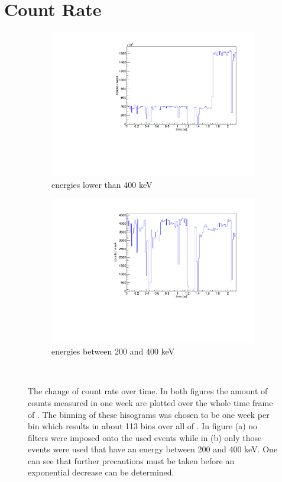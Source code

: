 \documentclass[encoding=utf8,british]{tumphthesis}
\begin{document}
\section{Count Rate}
\label{sec:EventAct}

\begin{figure}[t!]
	\centering
	\begin{subfigure}{.475\textwidth}
		\centering
		\includegraphics[width=\textwidth]{./Bilder/ZeitverlaufALLE.pdf}
		\caption{energies lower than 400 keV}
		\label{fig:ZeitAll}
	\end{subfigure}\hfill%
	\begin{subfigure}{.475\textwidth}
		\centering
		\includegraphics[width=\textwidth]{./Bilder/ZeitverlaufLimits.pdf}
		\caption{energies between 200 and 400 keV}
		\label{fig:ZeitLimits}
	\end{subfigure}
    \\
    \caption{
    	The change of count rate over time.
    	In both figures the amount of counts measured in one week are plotted over the whole time frame of \PII. 
        The binning of these hisograms was chosen to be one week per bin which results in about 113 bins over all of  \PII.
    	In figure (a) no filters were imposed onto the used events while in (b) only those events were used that have an energy between 200 and 400 keV. 
    	One can see that further precautions must be taken before an exponential decrease can be determined. 
    	}
\end{figure}
\end{document}
